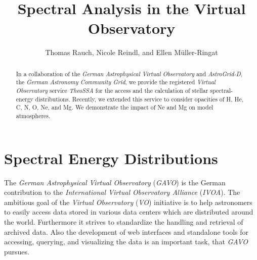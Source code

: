 \documentclass[11pt,twoside]{article}
\begin{document}
\title{Spectral Analysis in the Virtual Observatory}
\author{Thomas Rauch, Nicole Reindl, and Ellen M\"uller-Ringat}

\begin{abstract}
In a collaboration of the \emph{German Astrophysical Virtual Observatory}
and \emph{AstroGrid-D}, the \emph{German Astronomy Community Grid},
we provide the registered \emph{Virtual Observatory} service \emph{TheoSSA} for the access and the 
calculation of stellar spectral-energy distributions.
Recently, we extended this service to consider opacities of H, He, C, N, O, 
Ne, and Mg. We demonstrate the impact of Ne and Mg on model atmospheres. 
\end{abstract}


\section{Spectral Energy Distributions }
\label{sect:seds}

The \emph{German Astrophysical Virtual Observatory} (\emph{GAVO}) is the German contribution to the 
\emph{International Virtual Observatory Alliance} (\emph{IVOA}). The ambitious goal of the \emph{Virtual 
Observatory} (\emph{VO}) initiative is to help astronomers to easily access data stored in various 
data centers which are distributed around the world. Furthermore it strives to 
standardize the handling and retrieval of archived data. Also the development of web 
interfaces and standalone tools for accessing, querying, and visualizing the
data is an important task, that \emph{GAVO} pursues.
\end{document}
